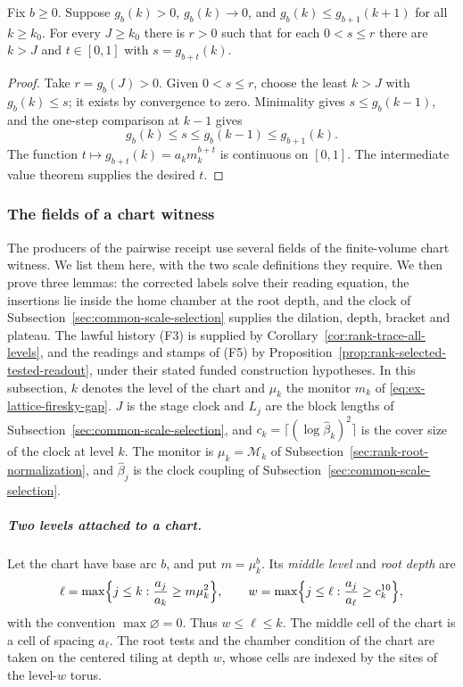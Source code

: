 \begin{lemma}
\label{lem:ex-lattice-firesky-gap-interpolation}
Fix $b\geq0$. Suppose $g_b(k)>0$, $g_b(k)\to0$, and
$g_b(k)\leq g_{b+1}(k+1)$ for all $k\geq k_0$. For every $J\geq k_0$
there is $r>0$ such that for each $0<s\leq r$ there are $k>J$ and
$t\in[0,1]$ with $s=g_{b+t}(k)$.
\end{lemma}
\begin{proof}
Take $r=g_b(J)>0$. Given $0<s\leq r$, choose the least $k>J$ with
$g_b(k)\leq s$; it exists by convergence to zero. Minimality gives
$s\leq g_b(k-1)$, and the one-step comparison at $k-1$ gives
\[
 g_b(k)\leq s\leq g_b(k-1)\leq g_{b+1}(k).
\]
The function $t\mapsto g_{b+t}(k)=a_km_k^{b+t}$ is continuous on
$[0,1]$. The intermediate value theorem supplies the desired $t$.
\end{proof}

\subsubsection{The fields of a chart witness}
\label{subsec:ex-lattice-firesky-witness}

The producers of the pairwise receipt use several fields of the
finite-volume chart witness. We list them here, with the two scale
definitions they require. We then prove three lemmas: the corrected labels
solve their reading equation, the insertions lie inside the home chamber
at the root depth, and the clock of
Subsection~\ref{sec:common-scale-selection} supplies the dilation, depth,
bracket and plateau. The lawful history (F3) is supplied by
Corollary~\ref{cor:rank-trace-all-levels}, and the readings and stamps
of (F5) by Proposition~\ref{prop:rank-selected-tested-readout}, under
their stated funded construction hypotheses. In this subsection, $k$
denotes the level of the chart and $\mu_k$ the monitor $m_k$ of
\eqref{eq:ex-lattice-firesky-gap}. $J$ is the stage clock and $L_j$ are
the block lengths of Subsection~\ref{sec:common-scale-selection}, and
$c_k=\lceil(\log\widehat\beta_k)^2\rceil$ is the cover size of the clock
at level $k$. The monitor is $\mu_k=\mathcal M_k$ of
Subsection~\ref{sec:rank-root-normalization}, and $\widehat\beta_j$ is the
clock coupling of Subsection~\ref{sec:common-scale-selection}.

\subparagraph{Two levels attached to a chart.}
Let the chart have base arc $b$, and put $m=\mu_k^b$. Its \emph{middle
level} and \emph{root depth} are
\[
 \ell=\max\Bigl\{j\le k:\frac{a_j}{a_k}\ge m\mu_k^{2}\Bigr\},\qquad
 w=\max\Bigl\{j\le\ell:\frac{a_j}{a_\ell}\ge c_k^{10}\Bigr\},
\]
with the convention $\max\varnothing=0$. Thus $w\le\ell\le k$. The middle
cell of the chart is a cell of spacing $a_\ell$. The root tests and the
chamber condition of the chart are taken on the centered tiling at depth
$w$, whose cells are indexed by the sites of the level-$w$ torus.

